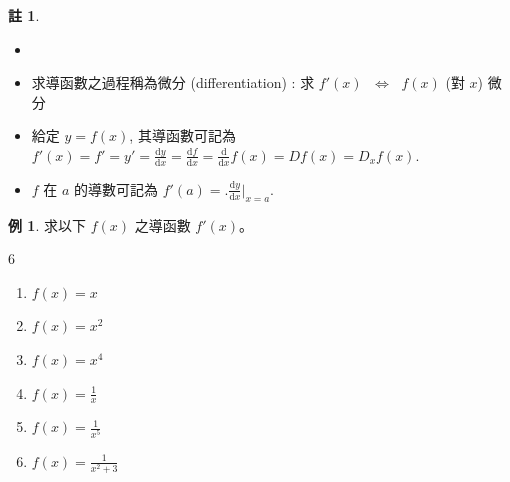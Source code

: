 \documentclass[12pt]{extarticle}
\newcommand{\ds}{\displaystyle}
\newcommand{\ifff}{\;\Longleftrightarrow\;}
\theoremstyle{definition}
\newtheorem*{ex}{例}
\newtheorem*{rmk}{註}
\begin{document}
\begin{rmk}
  \begin{itemize}\setlength\itemsep{0em}
    \item[]
    \item 求導函數之過程稱為微分 (differentiation) : 求 $f'(x)$ $\ifff$ $f(x)$ (對 $x$) 微分
    \item 給定 $y = f(x)$, 其導函數可記為 $\ds f'(x) = f' = y' = \frac{\text{d}y}{\text{d}x} = \frac{\text{d}f}{\text{d}x} = \frac{\text{d}}{\text{d}x} f(x) = Df(x) = D_x f(x)$. 
    \item $f$ 在 $a$ 的導數可記為 $\ds f'(a) = \Big.\frac{\text{d}y}{\text{d}x}\Big|_{x = a}$.  
  \end{itemize}
\end{rmk}

\begin{ex}
  求以下 $f(x)$ 之導函數 $f'(x)$。
  \setlength{\columnsep}{-7mm}
  \begin{multicols}{6}
    \begin{enumerate}\setlength\itemsep{0em}
      \item $f(x) = x$ 
      \item $f(x) = x^2$
      \item $f(x) = x^4$
      \item $f(x) = \frac{1}{x}$ 
      \item $f(x) = \frac{1}{x^5}$
      \item $f(x) = \frac{1}{x^2 + 3}$
    \end{enumerate}
  \end{multicols}
\end{ex}
\end{document}
